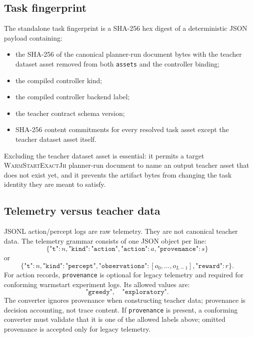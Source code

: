 \documentclass[11pt]{article}
\newcommand{\Warm}{\textnormal{\textsc{WarmStartExactJh}}}
\begin{document}
\subsection{Task fingerprint}
\label{sec:task-fingerprint}

The standalone task fingerprint is a SHA-256 hex digest of a deterministic JSON
payload containing:
\begin{itemize}
    \item the SHA-256 of the canonical planner-run document bytes with the
    teacher dataset asset removed from both \texttt{assets} and the controller
    binding;
    \item the compiled controller kind;
    \item the compiled controller backend label;
    \item the teacher contract schema version;
    \item SHA-256 content commitments for every resolved task asset except the
    teacher dataset asset itself.
\end{itemize}
Excluding the teacher dataset asset is essential: it permits a target \Warm{}
planner-run document to name an output teacher asset that does not exist yet,
and it prevents the artifact bytes from changing the task identity they are
meant to satisfy.

\subsection{Telemetry versus teacher data}
\label{sec:telemetry}

JSONL action/percept logs are raw telemetry. They are not canonical teacher
data. The telemetry grammar consists of one JSON object per line:
\[
\{\texttt{"t"}:n,\texttt{"kind"}:\texttt{"action"},\texttt{"action"}:a,
\texttt{"provenance"}:s\}
\]
or
\[
\{\texttt{"t"}:n,\texttt{"kind"}:\texttt{"percept"},
\texttt{"observations"}:[o_0,\dots,o_{L-1}],\texttt{"reward"}:r\}.
\]
For action records, \texttt{provenance} is optional for legacy telemetry and
required for conforming warmstart experiment logs. Its allowed values are:
\[
\texttt{"greedy"},\quad
\texttt{"exploratory"}.
\]
The converter ignores provenance when constructing teacher data; provenance is
decision accounting, not trace content. If \texttt{provenance} is present, a
conforming converter must validate that it is one of the allowed labels above;
omitted provenance is accepted only for legacy telemetry.
\end{document}
